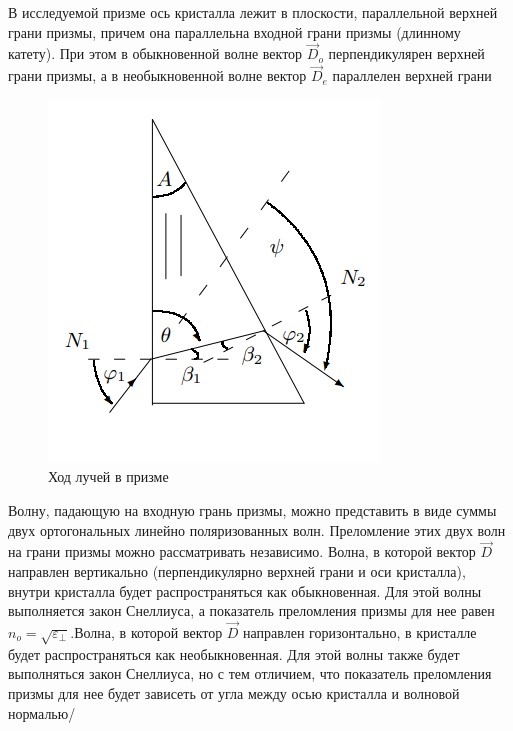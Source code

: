 \documentclass[a4paper,12pt]{article}
\begin{document}
В исследуемой призме ось кристалла лежит в плоскости, параллельной верхней грани призмы, причем она параллельна входной грани призмы (длинному катету). При этом в обыкновенной волне вектор $\vec{D}_o$ перпендикулярен верхней грани призмы, а в необыкновенной волне вектор $\vec{D}_e$ параллелен верхней грани

\begin{figure} 
	\includegraphics[width=\linewidth]{fig4}
	\caption{Ход лучей в призме}
\end{figure}

Волну, падающую на входную грань призмы, можно представить в виде суммы двух ортогональных линейно поляризованных волн. Преломление этих двух волн на грани призмы можно рассматривать независимо. Волна, в которой вектор $\vec{D}$ направлен вертикально (перпендикулярно верхней грани и оси кристалла), внутри кристалла будет распространяться как обыкновенная. Для этой волны выполняется закон Снеллиуса, а показатель преломления призмы для нее равен $n_o = \sqrt{\varepsilon_{\perp}}$.Волна, в которой вектор $\vec{D}$ направлен горизонтально, в кристалле будет распространяться как необыкновенная. Для этой волны также будет выполняться закон Снеллиуса, но с тем отличием, что показатель преломления призмы для нее будет зависеть от угла между осью кристалла и волновой нормалью/
\end{document}
